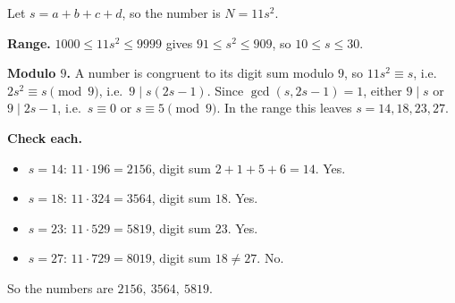 Let $s=a+b+c+d$, so the number is $N=11s^2$.

\textbf{Range.} $1000\le11s^2\le9999$ gives $91\le s^2\le909$, so $10\le s\le30$.

\textbf{Modulo $9$.} A number is congruent to its digit sum modulo $9$, so $11s^2\equiv s$, i.e.\ $2s^2\equiv s\pmod9$, i.e.\ $9\mid s(2s-1)$. Since $\gcd(s,2s-1)=1$, either $9\mid s$ or $9\mid 2s-1$, i.e.\ $s\equiv0$ or $s\equiv5\pmod9$. In the range this leaves $s=14,18,23,27$.

\textbf{Check each.}
\begin{itemize}
\item $s=14$: $11\cdot196=2156$, digit sum $2+1+5+6=14$. Yes.
\item $s=18$: $11\cdot324=3564$, digit sum $18$. Yes.
\item $s=23$: $11\cdot529=5819$, digit sum $23$. Yes.
\item $s=27$: $11\cdot729=8019$, digit sum $18\ne27$. No.
\end{itemize}
So the numbers are $\boxed{2156,\ 3564,\ 5819}$.
